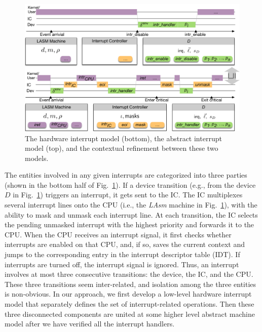 \begin{figure}[t]
	\begin{center}
		\includegraphics[scale=0.4]{figs/interrupt}
	\end{center}
	\caption{The hardware interrupt model (bottom), the
          abstract interrupt model (top), and the contextual
          refinement between these two models.}
	\label{fig:interrupt}
\end{figure}

The entities involved in any given interrupts are categorized into three parties
(shown in the bottom half of Fig.~\ref{fig:interrupt}).  If a device transition
(e.g., from the device $D$ in Fig.~\ref{fig:interrupt}) triggers an interrupt,
it gets sent to the IC.  The IC multiplexes several interrupt lines onto the CPU
(i.e., the \textit{LAsm} machine in Fig.~\ref{fig:interrupt}), with the ability
to mask and unmask each interrupt line. At each transition, the IC selects the
pending unmasked interrupt with the highest priority and forwards it to the CPU.
When the CPU receives an interrupt signal, it first checks whether interrupts
are enabled on that CPU, and, if so, saves the current context and jumps to the
corresponding entry in the interrupt descriptor table (IDT). If interrupts are
turned off, the interrupt signal is ignored. Thus, an interrupt involves at most
three consecutive transitions: the device, the IC, and the CPU.  These three
transitions seem inter-related, and isolation among the three entities is
non-obvious.  In our approach, we first develop a low-level hardware interrupt
model that separately defines the set of interrupt-related operations.  Then
these three disconnected components are united at some higher level abstract
machine model after we have verified all the interrupt handlers.


